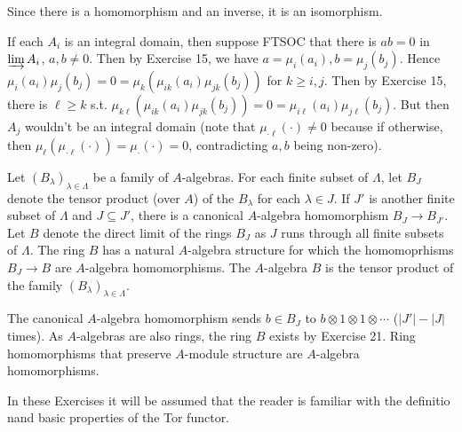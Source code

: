 \documentclass[a4paper]{exam}
\begin{document}
\begin{questions}
\begin{solution}
		Since there is a homomorphism and an inverse, it is an isomorphism.

		If each $A_i$ is an integral domain, then suppose FTSOC that there is $ab = 0$ in $\varinjlim A_i $, $a,b\ne 0$.
		Then by Exercise 15, we have $a = \mu_i(a_i),b=\mu_j(b_j)$.
		Hence $\mu _i(a_i)\mu _j(b_j) = 0 = \mu _k(\mu _{ik}(a_i)\mu _{jk}(b_j))$ for $k\ge i,j$.
		Then by Exercise 15, there is $\ell\ge k$ s.t. $\mu _{k\ell}(\mu _{ik}(a_i)\mu _{jk}(b_j)) = 0 = \mu _{i\ell}(a_i)\mu _{j\ell}(b_j)$.
		But then $A_j$ wouldn't be an integral domain (note that $\mu _{\cdot \ell}(\cdot) \ne 0$ because if otherwise, then $\mu _\ell(\mu _{\cdot \ell}(\cdot)) = \mu_{\cdot}(\cdot) = 0$, contradicting $a,b$ being non-zero).
	\end{solution}

	\question Let $(B_{\lambda })_{\lambda \in \Lambda}$ be a family of $A$-algebras. For each finite subset of $\Lambda $, let $B_J$ denote the tensor product (over $A $) of the $B_{\lambda}$ for each $\lambda \in J$. If $J'$ is another finite subset of $\Lambda$ and $J\subseteq J' $, there is a canonical $A$-algebra homomorphism $B_J\to B_{J'}$. Let $B$ denote the direct limit of the rings $B_J$ as $J$ runs through all finite subsets of $\Lambda$. The ring $B$ has a natural $A$-algebra structure for which the homomoprhisms $B_J\to B$ are $A$-algebra homomorphisms. The $A$-algebra $B$ is the tensor product of the family $(B_{\lambda})_{\lambda\in \Lambda}$.
	\begin{solution}
		The canonical $A$-algebra homomorphism sends $b\in B_J$ to $b \otimes 1 \otimes 1 \otimes \cdots$ ($|J'| - |J|$ times).
		As $A$-algebras are also rings, the ring $B$ exists by Exercise 21.
		Ring homomorphisms that preserve $A$-module structure are $A$-algebra homomorphisms.
	\end{solution}

	\question In these Exercises it will be assumed that the reader is familiar with the definitio nand basic properties of the Tor functor.


\end{questions}
\end{document}
